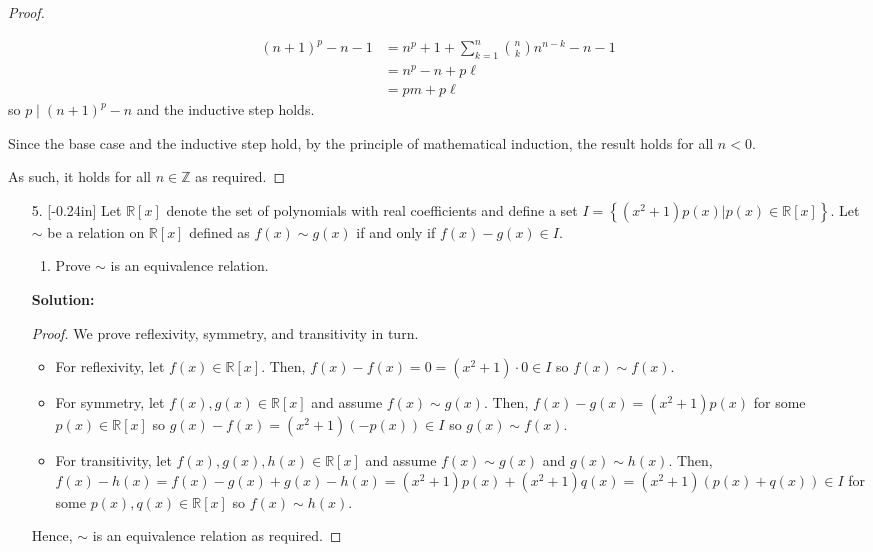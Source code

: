 \documentclass[letterpaper,12pt]{article}
\newcommand{\set}[1]{\left\{ #1 \right\}}
\theoremstyle{definition}
\begin{document}
\begin{enumerate}
\begin{mdframed}
\begin{proof}
\begin{itemize}
\begin{itemize}
\begin{align*}
                         (n+1)^{p} - n - 1 &= n^p + 1 + \sum_{k=1}^{n}{n \choose k} n^{n-k} -n-1\\
                     &= n^p - n + p\ell \\
                     &= pm + p\ell
                     \end{align*}
                     so $p \mid (n+1)^p - n$ and the inductive step holds.
                     \end{itemize}
                        Since the base case and the inductive step hold, by the principle of mathematical induction, the result holds for all $n < 0$.
                 \end{itemize}
                 As such, it holds for all $n \in \mathbb{Z}$ as required.
         \end{proof}
    \end{mdframed}
\end{enumerate}
\pagebreak
\begin{enumerate}
    \item[5.]  \reversemarginpar{}[-0.24in] Let $\mathbb{R}[x]$ denote the set of polynomials with real coefficients and define a set $I = \set{(x^2+1)p(x) | p(x) \in \mathbb{R}[x]}$. Let $\sim$ be a relation on $\mathbb{R}[x]$ defined as $f(x) \sim g(x)$ if and only if $f(x)-g(x) \in I$.
    \begin{enumerate}
        \item Prove $\sim$ is an equivalence relation.
        \end{enumerate}
        \begin{mdframed}
            \textbf{Solution:}
            \begin{proof}
                We prove reflexivity, symmetry, and transitivity in turn. \begin{itemize}
                    \item For reflexivity, let $f(x) \in \mathbb{R}[x]$. Then, $f(x) - f(x) = 0 = (x^2+1)\cdot 0 \in I$ so $f(x) \sim f(x)$.
                    \item For symmetry, let $f(x),g(x) \in \mathbb{R}[x]$ and assume $f(x) \sim g(x)$. Then, $f(x) - g(x) = (x^2+1)p(x)$ for some $p(x) \in \mathbb{R}[x]$ so $g(x) - f(x) = (x^2+1)(-p(x)) \in I$ so $g(x) \sim f(x)$.
                    \item For transitivity, let $f(x),g(x),h(x) \in \mathbb{R}[x]$ and assume $f(x) \sim g(x)$ and $g(x) \sim h(x)$. Then, $f(x) - h(x) = f(x)-g(x) + g(x) - h(x) = (x^2+1)p(x) + (x^2+1)q(x) = (x^2+1)(p(x)+q(x)) \in I$ for some $p(x),q(x) \in \mathbb{R}[x]$ so $f(x) \sim h(x)$.
                \end{itemize}
                Hence, $\sim$ is an equivalence relation as required.
            \end{proof}
        \end{mdframed}
\end{enumerate}
\end{document}
